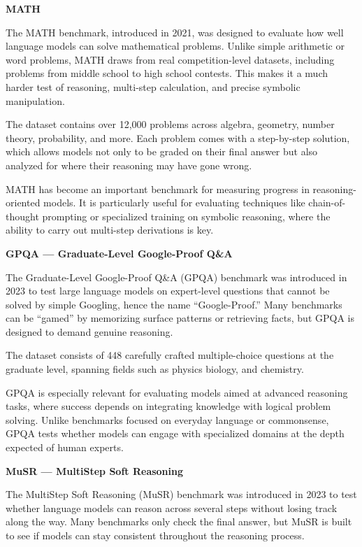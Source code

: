 \textbf{MATH}


The MATH benchmark, introduced in 2021, was designed to evaluate how well language models can solve mathematical problems. Unlike simple arithmetic
or word problems, MATH draws from real competition-level datasets, including problems from middle school to high school contests. This makes it a
much harder test of reasoning, multi-step calculation, and precise symbolic manipulation.

The dataset contains over 12,000 problems across algebra, geometry, number theory, probability, and more. Each problem comes with a step-by-step
solution, which allows models not only to be graded on their final answer but also analyzed for where their reasoning may have gone wrong.

MATH has become an important benchmark for measuring progress in reasoning-oriented models. It is particularly useful for evaluating techniques
like chain-of-thought prompting or specialized training on symbolic reasoning, where the ability to carry out multi-step derivations is key.

\textbf{GPQA — Graduate-Level Google-Proof Q\&A}


The Graduate-Level Google-Proof Q\&A (GPQA) benchmark was introduced in 2023 to test large language models on expert-level questions that cannot
be solved by simple Googling, hence the name “Google-Proof.” Many benchmarks can be “gamed” by memorizing surface patterns or retrieving facts,
but GPQA is designed to demand genuine reasoning.

The dataset consists of 448 carefully crafted multiple-choice questions at the graduate level, spanning fields such as
physics biology, and chemistry.

GPQA is especially relevant for evaluating models aimed at advanced reasoning tasks, where success depends on integrating knowledge with
logical problem solving. Unlike benchmarks focused on everyday language or commonsense, GPQA tests whether models can engage with specialized
domains at the depth expected of human experts.

\textbf{MuSR — MultiStep Soft Reasoning}


The MultiStep Soft Reasoning (MuSR) benchmark was introduced in 2023 to test whether language models can reason across several steps without
losing track along the way. Many benchmarks only check the final answer, but MuSR is built to see if models can stay consistent throughout the
reasoning process.

